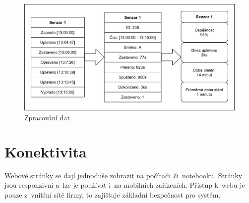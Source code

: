 \begin{figure}[htbp]
    \centering
    \includegraphics[width=\textwidth]{img/Princip.png}
    \caption{Zpracování dat}
    \label{fig:princip}
\end{figure}

\section{Konektivita}
Webové stránky se dají jednoduše zobrazit na počítači~či~notebooku.
Stránky jsou responzivní a~lze je používat i~na mobilních zařízeních.
Přístup k~webu je pouze z~vnitřní sítě firmy, to zajišťuje základní bezpečnost pro systém.


\newpage